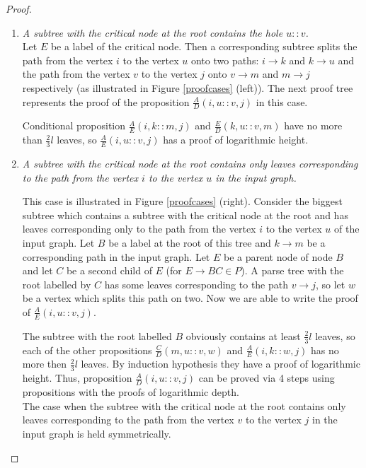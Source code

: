 \begin{proof}
\begin{enumerate}
\item \textit{A subtree with the critical node at the root contains the hole $u :: v$.} 
\\ Let $E$ be a label of the critical node. Then a corresponding subtree splits the path from the vertex $i$ to the vertex $u$ onto two paths: $i \rightarrow k$ and $k \rightarrow u$ and the path from the vertex $v$ to the vertex $j$ onto $v \rightarrow m$ and $m \rightarrow j$ respectively (as illustrated in Figure \ref{proofcases} (left)). The next proof tree represents the proof of the proposition $\frac{A}{D}(i , u ::v, j)$ in this case. 
\begin{prooftree}
\end{prooftree}
Conditional proposition $\frac{A}{E}(i , k :: m , j)$ and $\frac{E}{D}(k , u :: v , m)$ have no more than $\frac{2}{3}l$ leaves, so $\frac{A}{E}(i , u :: v , j)$ has a proof of logarithmic height.

\item \textit{A subtree with the critical node at the root contains only leaves corresponding to the path from the vertex $i$ to the vertex $u$ in the input graph.}


This case is illustrated in Figure \ref{proofcases} (right). Consider the biggest subtree which contains a subtree with the critical node at the root and has leaves corresponding only to the path from the vertex $i$ to the vertex $u$ of the input graph. Let $B$ be a label at the root of this tree and $k \rightarrow m$  be a corresponding path in the input graph. Let $E$ be a parent node of node $B$ and let $C$ be a second child of $E$ (for $E \rightarrow BC \in P$). A parse tree with the root labelled by $C$ has some leaves corresponding to the path $v \rightarrow j$, so let $w$ be a vertex which splits this path on two. Now we are able to write the proof of $\frac{A}{E}(i , u :: v , j)$.
\begin{prooftree}
\end{prooftree}
The subtree with the root labelled $B$ obviously contains at least $\frac{2}{3}l$ leaves, so each of the other propositions $\frac{C}{D}(m , u :: v , w)$ and $\frac{A}{E}(i , k :: w , j)$ has no more then  $\frac{2}{3}l$ leaves. By induction hypothesis they have a proof of logarithmic height. Thus, proposition  $\frac{A}{D}(i , u :: v , j)$ can be proved via 4 steps using propositions with the proofs of logarithmic depth.
\\The case when the subtree with the critical node at the root contains only leaves corresponding to the path from the vertex $v$ to the vertex $j$ in the input graph is held symmetrically.
\end{enumerate}
\end{proof}
